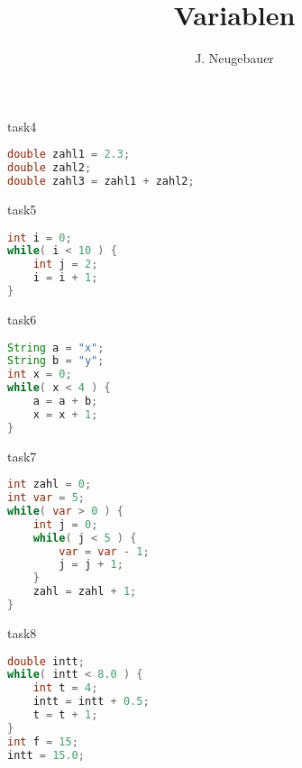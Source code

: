 \documentclass[10pt, a4paper]{scrartcl}
\author{J. Neugebauer}
\title{Variablen}
\date{\Heute}
\begin{document}
\ReiheTitel

\begin{savelst}{task4}
\begin{lstlisting}[language=java]
double zahl1 = 2.3;
double zahl2;
double zahl3 = zahl1 + zahl2;
\end{lstlisting}
\end{savelst}

\begin{savelst}{task5}
\begin{lstlisting}[language=java]
int i = 0;
while( i < 10 ) {
	int j = 2;
	i = i + 1;
}
\end{lstlisting}
\end{savelst}

\begin{savelst}{task6}
\begin{lstlisting}[language=java]
String a = "x";
String b = "y";
int x = 0;
while( x < 4 ) {
	a = a + b;
	x = x + 1;
}
\end{lstlisting}
\end{savelst}

\begin{savelst}{task7}
\begin{lstlisting}[language=java]
int zahl = 0;
int var = 5;
while( var > 0 ) {
	int j = 0;
	while( j < 5 ) {
		var = var - 1;
		j = j + 1;
	}
	zahl = zahl + 1;
}
\end{lstlisting}
\end{savelst}

\begin{savelst}{task8}
\begin{lstlisting}[language=java]
double intt;
while( intt < 8.0 ) {
	int t = 4;
	intt = intt + 0.5;
	t = t + 1;
}
int f = 15;
intt = 15.0;
\end{lstlisting}
\end{savelst}
\end{document}
